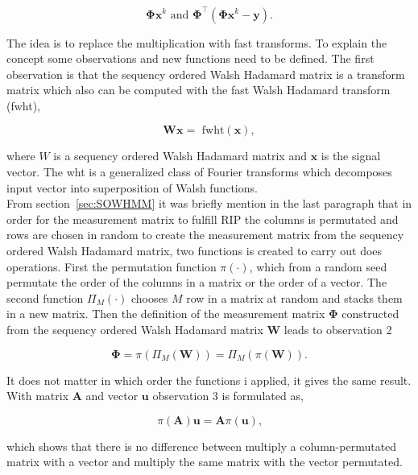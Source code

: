 \begin{equation}
\mathbf{\Phi}\mathbf{x}^k \text{ and } \mathbf{\Phi}^\top(\mathbf{\Phi}\mathbf{x}^k-\mathbf{y})\text{.}
\end{equation}

The idea is to replace the multiplication with fast transforms. To explain the concept some observations and new functions need to be defined. The first observation is that the sequency ordered Walsh Hadamard matrix is a transform matrix which also can be computed with the fast Walsh Hadamard transform (fwht),

\begin{equation}
\mathbf{W}\mathbf{x} = \text{ fwht}(\mathbf{x}),
\end{equation}

where $W$ is a sequency ordered Walsh Hadamard matrix and $\mathbf{x}$ is the signal vector. The wht is a generalized class of Fourier transforms which decomposes input vector into superposition of Walsh functions.\\[0.1in]

From section~\ref{sec:SOWHMM} it was briefly mention in the last paragraph that in order for the measurement matrix to fulfill RIP the columns is permutated and rows are chosen in random to create the measurement matrix from the sequency ordered Walsh Hadamard matrix, two functions is created to carry out does operations. First the permutation function $\pi(\cdot)$, which from a random seed permutate the order of the columns in a matrix or the order of a vector. The second function $\Pi_M(\cdot)$ chooses $M$ row in a matrix at random and stacks them in a new matrix. Then the definition of the measurement matrix $\mathbf{\Phi}$ constructed from the sequency ordered Walsh Hadamard matrix $\mathbf{W}$ leads to observation 2

\begin{equation}
\mathbf{\Phi} = \pi(\Pi_M(\mathbf{W})) = \Pi_M(\pi(\mathbf{W}))\text{.}
\end{equation}

It does not matter in which order the functions i applied, it gives the same result. With matrix $\mathbf{A}$ and vector $\mathbf{u}$ observation 3 is formulated as,

\begin{equation}
\pi(\mathbf{A})\mathbf{u} = \mathbf{A}\pi(\mathbf{u})\text{,}
\end{equation}

which shows that there is no difference between multiply a column-permutated matrix with a vector and multiply the same matrix with the vector permutated.\\[0.1in]


